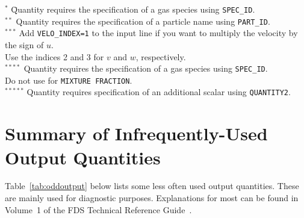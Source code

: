 \documentclass[11pt]{book}
\newcommand{\ct}{\tt\small}
\begin{document}
\noindent
\begin{tabbing}
$^{*}$  \hspace{0.25in} \= Quantity requires the specification of a gas species using {\ct SPEC\_ID}. \\
$^{**}$                \> Quantity requires the specification of a particle name using {\ct PART\_ID}. \\
$^{***}$               \> Add {\ct VELO\_INDEX=1} to the input line if you want to multiply the velocity by the sign of $u$. \\
                       \> Use the indices 2 and 3 for $v$ and $w$, respectively.\\
$^{****}$              \> Quantity requires the specification of a gas species using {\ct SPEC\_ID}. \\
                       \> Do not use for {\ct MIXTURE FRACTION}.\\
$^{*****}$             \> Quantity requires specification of an additional scalar using {\ct QUANTITY2}.
\end{tabbing}


\clearpage
\section{Summary of Infrequently-Used Output Quantities}
\label{info:oddoutputquantities}

Table~\ref{tab:oddoutput} below lists some less often used output quantities. These are mainly used for diagnostic purposes. Explanations for most can
be found in Volume~1 of the FDS Technical Reference Guide~\cite{FDS_Math_Guide}.
\end{document}
